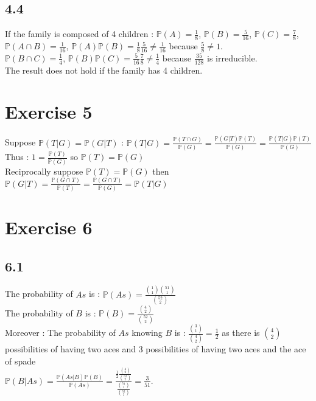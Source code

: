 \documentclass{article}
\begin{document}
    \subsection*{4.4}
    If the family is composed of 4 children : 
    $\mathbb{P}(A) = \frac{1}{8}$, $\mathbb{P}(B) = \frac{5}{16}$, $\mathbb{P}(C) = \frac{7}{8}$, 
    \\
    $\mathbb{P}(A\cap B) = \frac{1}{16}$, $\mathbb{P}(A)\mathbb{P}(B) = \frac{1}{8}\frac{5}{16} \neq \frac{1}{16}$ because $\frac{5}{8} \neq 1$.
    \\
    $\mathbb{P}(B\cap C) = \frac{1}{4}$, $\mathbb{P}(B)\mathbb{P}(C) = \frac{5}{16}\frac{7}{8} \neq \frac{1}{4}$ because $\frac{35}{128}$ is irreducible.
    \\
    The result does not hold  if the family has 4 children.
    
    
    \section*{Exercise 5}
    Suppose $\mathbb{P}(T|G) = \mathbb{P}(G|T)$ : 
    $\mathbb{P}(T|G) = \frac{\mathbb{P}(T\cap G)}{\mathbb{P}(G)}=\frac{\mathbb{P}(G|T)\mathbb{P}(T)}{\mathbb{P}(G)} = \frac{\mathbb{P}(T|G)\mathbb{P}(T)}{\mathbb{P}(G)}$
    \\
    Thus : $1 = \frac{\mathbb{P}(T)}{\mathbb{P}(G)}$ so $\mathbb{P}(T) = \mathbb{P}(G)$
    \\
    Reciprocally suppose $\mathbb{P}(T) = \mathbb{P}(G)$ then $\mathbb{P}(G|T) = \frac{\mathbb{P}(G \cap T)}{\mathbb{P}(T)} =\frac{\mathbb{P}(G \cap T)}{\mathbb{P}(G)} = \mathbb{P}(T|G)$
    \section*{Exercise 6}
    \subsection*{6.1}
    The probability of $As$ is : $\mathbb{P}(As) = \frac{\binom{1}{1}\binom{51}{1}}{\binom{52}{2}}$
    \\
    The probability of $B$ is  : $\mathbb{P}(B) = \frac{\binom{4}{2}}{\binom{52}{2}}$
    \\
    Moreover : The probability of $As$ knowing $B$ is : $\frac{\binom{3}{1}}{\binom{4}{2}}=\frac{1}{2}$ as there is $\binom{4}{2}$ possibilities of having two aces and 3 possibilities of having two aces and the ace of spade
    \\
    $\mathbb{P}(B|As) = \frac{\mathbb{P}(As|B)\mathbb{P}(B)}{\mathbb{P}(As)} = \frac{\frac{1}{2}\frac{\binom{4}{2}}{\binom{52}{2}}}{\frac{\binom{51}{1}}{\binom{52}{2}}} = \frac{3}{51}$.
    \\
\end{document}
